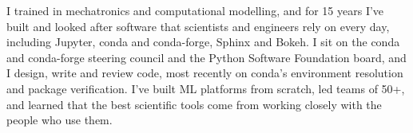 
\begin{cvparagraph}
I trained in mechatronics and computational modelling, and for 15 years I've built and looked after software that scientists and engineers rely on every day, including Jupyter, conda and conda-forge, Sphinx and Bokeh. I sit on the conda and conda-forge steering council and the Python Software Foundation board, and I design, write and review code, most recently on conda's environment resolution and package verification. I've built ML platforms from scratch, led teams of 50+, and learned that the best scientific tools come from working closely with the people who use them.
\end{cvparagraph}
